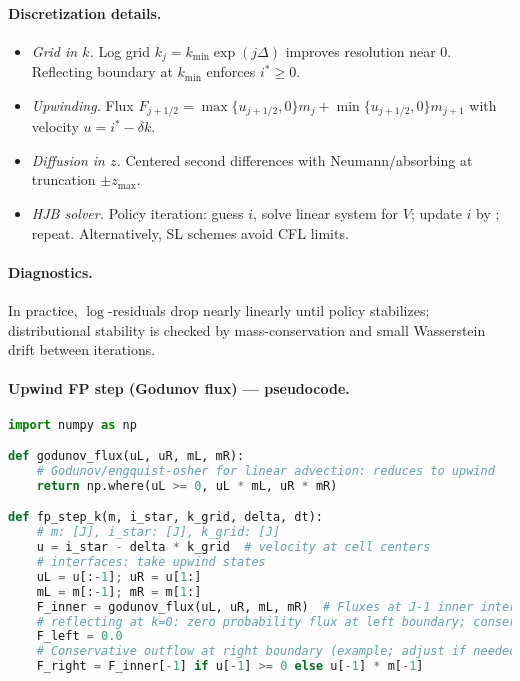 ﻿\documentclass[11pt,letterpaper,oneside]{article}
\numberwithin{equation}{section}
\newcommand{\ac}[1]{{\mdseries\textsc{#1}}}
\newcommand{\1}{\mathbf{1}}
\begin{document}
\begin{tcolorbox}[didacticstyle]
\begin{itemize}[leftmargin=1.1em,itemsep=0.25em]
\paragraph{Discretization details.}
\begin{itemize}[leftmargin=1.25em]
\item \emph{Grid in $k$.} Log grid $k_j=k_{\min}\exp(j\Delta)$ improves resolution near $0$. Reflecting boundary at $k_{\min}$ enforces $i^*\!\ge 0$.
\item \emph{Upwinding.} Flux $F_{j+1/2}=\max\{u_{j+1/2},0\}m_j+\min\{u_{j+1/2},0\}m_{j+1}$ with velocity $u=i^*-\delta k$.
\item \emph{Diffusion in $z$.} Centered second differences with Neumann/absorbing at truncation $\pm z_{\max}$.
\item \emph{HJB solver.} Policy iteration: guess $i$, solve linear system for $V$; update $i$ by ; repeat. Alternatively, \ac{SL} schemes avoid CFL limits.
\end{itemize}

\paragraph{Diagnostics.} In practice, $\log$-residuals drop nearly linearly until policy stabilizes; distributional stability is checked by mass-conservation and small Wasserstein drift between iterations.

\paragraph{Upwind FP step (Godunov flux) --- pseudocode.}
\begin{lstlisting}[language=Python,caption={1D upwind FV update for k-transport (reflecting at k=0)}]
import numpy as np

def godunov_flux(uL, uR, mL, mR):
    # Godunov/engquist-osher for linear advection: reduces to upwind
    return np.where(uL >= 0, uL * mL, uR * mR)

def fp_step_k(m, i_star, k_grid, delta, dt):
    # m: [J], i_star: [J], k_grid: [J]
    u = i_star - delta * k_grid  # velocity at cell centers
    # interfaces: take upwind states
    uL = u[:-1]; uR = u[1:]
    mL = m[:-1]; mR = m[1:]
    F_inner = godunov_flux(uL, uR, mL, mR)  # Fluxes at J-1 inner interfaces
    # reflecting at k=0: zero probability flux at left boundary; conservative outflow at right
    F_left = 0.0
    # Conservative outflow at right boundary (example; adjust if needed)
    F_right = F_inner[-1] if u[-1] >= 0 else u[-1] * m[-1]


\end{lstlisting}
\end{itemize}
\end{tcolorbox}
\end{document}
